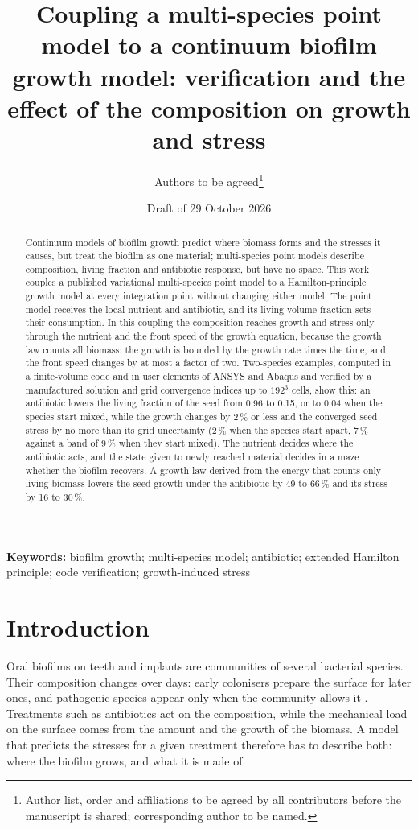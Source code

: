 \documentclass[11pt,a4paper]{article}
\title{Coupling a multi-species point model to a continuum biofilm growth model: verification and the effect of the composition on growth and stress}
\author{Authors to be agreed\thanks{Author list, order and affiliations to be agreed by all contributors before the manuscript is shared; corresponding author to be named.}}
\date{Draft of 29 October 2026}
\begin{document}
\maketitle

\begin{abstract}
Continuum models of biofilm growth predict where biomass forms and the stresses it causes, but treat the biofilm as one material; multi-species point models describe composition, living fraction and antibiotic response, but have no space. This work couples a published variational multi-species point model to a Hamilton-principle growth model at every integration point without changing either model. The point model receives the local nutrient and antibiotic, and its living volume fraction sets their consumption. In this coupling the composition reaches growth and stress only through the nutrient and the front speed of the growth equation, because the growth law counts all biomass: the growth is bounded by the growth rate times the time, and the front speed changes by at most a factor of two. Two-species examples, computed in a finite-volume code and in user elements of ANSYS and Abaqus and verified by a manufactured solution and grid convergence indices up to $192^3$ cells, show this: an antibiotic lowers the living fraction of the seed from 0.96 to 0.15, or to 0.04 when the species start mixed, while the growth changes by 2\,\% or less and the converged seed stress by no more than its grid uncertainty ($2\,\%$ when the species start apart, $7\,\%$ against a band of $9\,\%$ when they start mixed). The nutrient decides where the antibiotic acts, and the state given to newly reached material decides in a maze whether the biofilm recovers. A growth law derived from the energy that counts only living biomass lowers the seed growth under the antibiotic by 49 to 66\,\% and its stress by 16 to 30\,\%.
\end{abstract}

\noindent\textbf{Keywords:} biofilm growth; multi-species model; antibiotic; extended Hamilton principle; code verification; growth-induced stress

\section{Introduction}
\label{sec:intro}

Oral biofilms on teeth and implants are communities of several bacterial species. Their composition changes over days: early colonisers prepare the surface for later ones, and pathogenic species appear only when the community allows it \citep{Heine2025PeriImplant}. Treatments such as antibiotics act on the composition, while the mechanical load on the surface comes from the amount and the growth of the biomass. A model that predicts the stresses for a given treatment therefore has to describe both: where the biofilm grows, and what it is made of.
\end{document}
